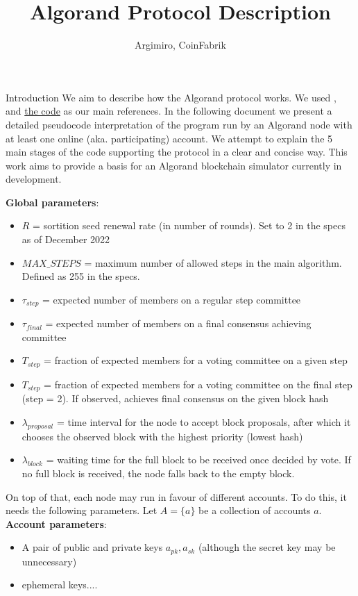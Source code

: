 \documentclass[10pt,a4paper]{article}
\author{Argimiro, CoinFabrik}
\title{Algorand Protocol Description}
\begin{document}
\maketitle
\tableofcontents

\begin{section}{Introduction}
We aim to describe how the Algorand protocol works. We used \cite{DBLP:conf/sosp/GiladHMVZ17},
\cite{DBLP:journals/corr/Micali16} and \href{https://www.a.com}{the code} as our main references.
In the following document we present a detailed pseudocode interpretation 
of the program run by an Algorand node with at least one online (aka. 
participating) account. 
We attempt to explain the 5 main stages of the code supporting 
the protocol in a clear and concise way.
This work aims to provide a basis for an Algorand blockchain simulator 
currently in development. 

\noindent \textbf{Global parameters}:
\begin{itemize}
    \item $R$ = sortition seed renewal rate (in number of rounds). Set to 2 in the specs
    as of December 2022
    \item $MAX\_STEPS$ = maximum number of allowed steps in the main algorithm. Defined 
    as 255 in the specs.
    \item $\tau_{step}$ = expected number of members on a regular step committee
    \item $\tau_{final}$ = expected number of members on a final consensus achieving committee
    \item $T_{step}$ = fraction of expected members for a voting committee on a given step
    \item $T_{step}$ = fraction of expected members for a voting committee on the final step (step = 2). If observed,
    achieves final consensus on the given block hash
    \item $\lambda_{proposal}$ = time interval for the node to accept block proposals, after
    which it chooses the observed block with the highest priority (lowest hash) 
    \item $\lambda_{block}$ = waiting time for the full block to be received once decided by vote.
    If no full block is received, the node falls back to the empty block.
  \end{itemize}

On top of that, each node may run in favour of different accounts. To do this,
it needs the following parameters. 
Let $A=\{a\}$ be a collection of accounts $a$.
\noindent \textbf{Account parameters}:
\begin{itemize}
    \item A pair of public and private keys $a_{pk}, a_{sk}$ (although the secret key may be unnecessary)
    \item ephemeral keys....
\end{itemize}

\end{section}
\end{document}
